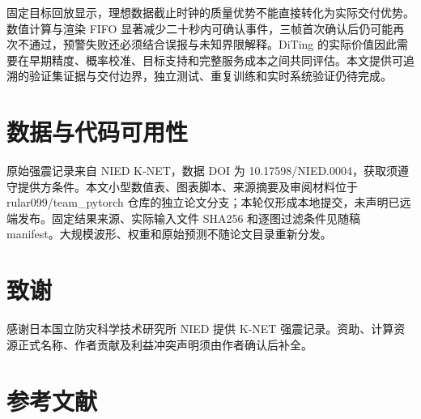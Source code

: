\documentclass[UTF8,a4paper,11pt]{ctexart}
\begin{document}
固定目标回放显示，理想数据截止时钟的质量优势不能直接转化为实际交付优势。数值计算与渲染 FIFO 显著减少二十秒内可确认事件，三帧首次确认后仍可能再次不通过，预警失败还必须结合误报与未知界限解释。DiTing 的实际价值因此需要在早期精度、概率校准、目标支持和完整服务成本之间共同评估。本文提供可追溯的验证集证据与交付边界，独立测试、重复训练和实时系统验证仍待完成。

\section*{数据与代码可用性}

原始强震记录来自 NIED K-NET，数据 DOI 为 10.17598/NIED.0004，获取须遵守提供方条件。本文小型数值表、图表脚本、来源摘要及审阅材料位于 rular099/team\_pytorch 仓库的独立论文分支；本轮仅形成本地提交，未声明已远端发布。固定结果来源、实际输入文件 SHA256 和逐图过滤条件见随稿 manifest。大规模波形、权重和原始预测不随论文目录重新分发。

\section*{致谢}

感谢日本国立防灾科学技术研究所 NIED 提供 K-NET 强震记录。资助、计算资源正式名称、作者贡献及利益冲突声明须由作者确认后补全。

\section*{参考文献}
\end{document}
